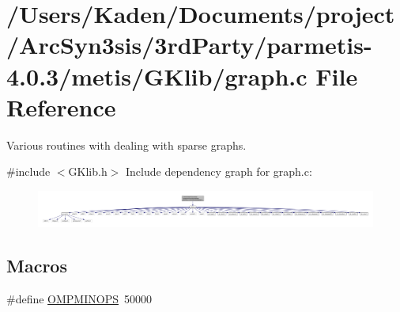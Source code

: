 \hypertarget{a00846}{}\section{/\+Users/\+Kaden/\+Documents/project/\+Arc\+Syn3sis/3rd\+Party/parmetis-\/4.0.3/metis/\+G\+Klib/graph.c File Reference}
\label{a00846}


Various routines with dealing with sparse graphs.  


{\ttfamily \#include $<$G\+Klib.\+h$>$}\newline
Include dependency graph for graph.\+c\+:\nopagebreak
\begin{figure}[H]
\begin{center}
\leavevmode
\includegraphics[width=350pt]{a00847}
\end{center}
\end{figure}
\subsection*{Macros}
\begin{DoxyCompactItemize}
\item 
\#define \hyperlink{a00846_afbb5013b831efde4d664bae299d7d2ee}{O\+M\+P\+M\+I\+N\+O\+PS}~50000
\end{DoxyCompactItemize}
